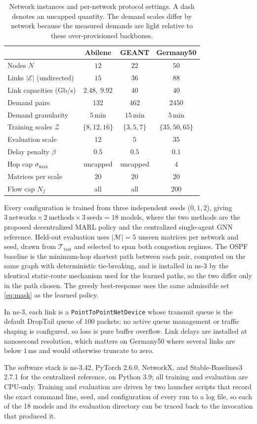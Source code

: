 \begin{table}[h]
\centering
\small
\begin{tabular}{lccc}
\hline
& Abilene & GEANT & Germany50 \\
\hline
Nodes $N$ & $12$ & $22$ & $50$ \\
Links $|\mathcal{E}|$ (undirected) & $15$ & $36$ & $88$ \\
Link capacities (Gb/s) & $2.48,\ 9.92$ & $40$ & $40$ \\
Demand pairs & $132$ & $462$ & $2450$ \\
Demand granularity & $5$\,min & $15$\,min & $5$\,min \\
\hline
Training scales $\mathcal{Z}$ & $\{8,12,16\}$ & $\{3,5,7\}$ & $\{35,50,65\}$ \\
Evaluation scale & $12$ & $5$ & $35$ \\
Delay penalty $\beta$ & $0.5$ & $0.5$ & $0.1$ \\
Hop cap $\sigma_{\max}$ & uncapped & uncapped & $4$ \\
Matrices per scale & $20$ & $20$ & $20$ \\
Flow cap $N_f$ & all & all & $200$ \\
\hline
\end{tabular}
\caption{Network instances and per-network protocol settings. A dash denotes an
uncapped quantity. The demand scales differ by network because the measured
demands are light relative to these over-provisioned backbones.}
\label{tab:setup}
\end{table}

Every configuration is trained from three independent seeds ($0,1,2$), giving
$3\ \text{networks}\times 2\ \text{methods}\times 3\ \text{seeds}=18$ models,
where the two methods are the proposed decentralized MARL policy and the
centralized single-agent GNN reference. Held-out evaluation uses
$|\mathcal{M}|=5$ unseen matrices per network and seed, drawn from
$\mathcal{T}_{\mathrm{test}}$ and selected to span both congestion regimes.
The OSPF baseline is the minimum-hop shortest path between each pair, computed
on the same graph with deterministic tie-breaking, and is installed in ns-3 by
the identical static-route mechanism used for the learned paths, so the two
differ only in the path chosen. The greedy best-response uses the same
admissible set \eqref{eq:mask} as the learned policy.

In ns-3, each link is a \texttt{PointToPointNetDevice} whose transmit queue is
the default DropTail queue of $100$ packets; no active queue management or
traffic shaping is configured, so loss is pure buffer overflow. Link delays are
installed at nanosecond resolution, which matters on Germany50 where several
links are below $1$\,ms and would otherwise truncate to zero.

The software stack is ns-3.42, PyTorch 2.6.0, NetworkX, and Stable-Baselines3
2.7.1 for the centralized reference, on Python 3.9; all training and evaluation
are CPU-only. Training and evaluation are driven by two launcher scripts that
record the exact command line, seed, and configuration of every run to a log
file, so each of the 18 models and its evaluation directory can be traced back
to the invocation that produced it.
